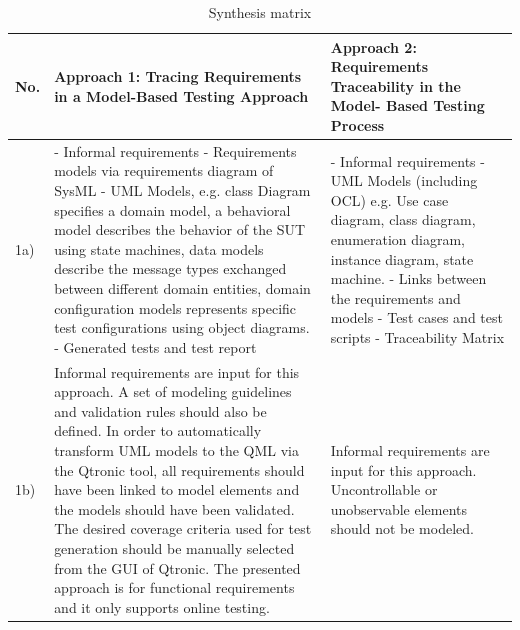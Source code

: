 \newpage
{}
\begin{landscape} 
\begin{small}
\begin{longtable}{ p{0.5cm} | p{11cm} | p{11cm} }
\caption{Synthesis matrix}
\label{tab:TSM}
\\    %
\hline
\textbf{No.} & \textbf{Approach 1: Tracing Requirements in a Model-Based Testing Approach}  & \textbf{Approach 2: Requirements Traceability in the Model- Based Testing Process} \\
\hline
1a) & - Informal requirements
\newline - Requirements models via requirements diagram of SysML
\newline - UML Models, e.g. class Diagram specifies a domain model, a behavioral model describes the behavior of the SUT using state machines, data models describe the message types exchanged between different domain entities, domain configuration models represents specific test configurations using object diagrams.
\newline - Generated tests and test report
 & - Informal requirements
\newline - UML Models (including OCL) e.g. Use case diagram, class diagram, enumeration diagram, instance diagram, state machine.
\newline - Links between the requirements and models
\newline - Test cases and test scripts
\newline - Traceability Matrix \\
\hline
1b) & Informal requirements are input for this approach.
\newline A set of modeling guidelines and validation rules should also be defined.
\newline In order to automatically transform UML models to the QML via the Qtronic tool, all requirements should have been linked to model elements and the models should have been validated.
\newline The desired coverage criteria used for test generation should be manually selected from the GUI of Qtronic.
\newline The presented approach is for functional requirements and it only supports online testing. & Informal requirements are input for this approach. 
\newline Uncontrollable or unobservable elements should not be modeled.\\

\end{longtable}
\end{small}
\end{landscape}
